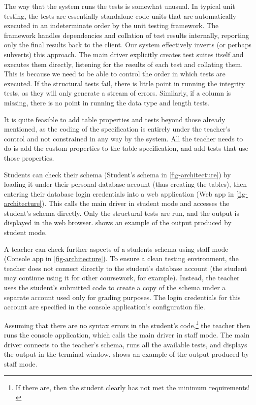 \documentclass[sigconf, authordraft, capitalise]{acmart}
\begin{document}
The way that the system runs the tests is somewhat unusual. In typical unit testing, the tests are essentially standalone code units that are automatically executed in an indeterminate order by the unit testing framework. The framework handles dependencies and collation of test results internally, reporting only the final results back to the client. Our system effectively inverts (or perhaps subverts) this approach. The main driver explicitly creates test suites itself and executes them directly, listening for the results of each test and collating them. This is because we need to be able to control the order in which tests are executed. If the structural tests fail, there is little point in running the integrity tests, as they will only generate a stream of errors. Similarly, if a column is missing, there is no point in running the data type and length tests.

It is quite feasible to add table properties and tests beyond those already mentioned, as the coding of the specification is entirely under the teacher's control and not constrained in any way by the system. All the teacher needs to do is add the custom properties to the table specification, and add tests that use those properties.

Students can check their schema (\textsf{Student's schema} in \cref{fig-architecture}) by loading it under their personal database account (thus creating the tables), then entering their database login credentials into a web application (\textsf{Web app} in \cref{fig-architecture}). This calls the main driver in student mode and accesses the student's schema directly. Only the structural tests are run, and the output is displayed in the web browser.  shows an example of the output produced by student mode.

A teacher can check further aspects of a students schema using staff mode (\textsf{Console app} in \cref{fig-architecture}). To ensure a clean testing environment, the teacher does not connect directly to the student's database account (the student may continue using it for other coursework, for example). Instead, the teacher uses the student's submitted code to create a copy of the schema under a separate account used only for grading purposes. The login credentials for this account are specified in the console application's configuration file.

Assuming that there are no syntax errors in the student's code,\footnote{If there are, then the student clearly has not met the minimum requirements!} the teacher then runs the console application, which calls the main driver in staff mode. The main driver connects to the teacher's schema, runs all the available tests, and displays the output in the terminal window.  shows an example of the output produced by staff mode.
\end{document}
